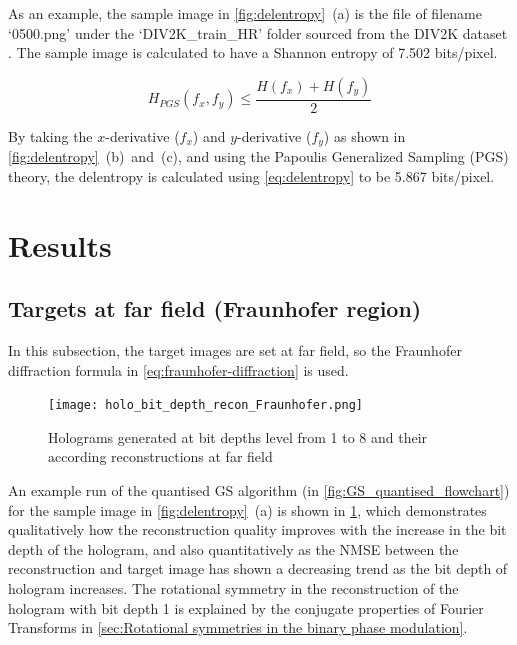 	As an example, the sample image in \cref{fig:delentropy}~(a) is the file of filename `0500.png' under the `DIV2K\_train\_HR' folder sourced from the DIV2K dataset \cite{Agustsson2017}. The sample image is calculated to have a Shannon entropy of 7.502 bits/pixel.

	\begin{equation}
		H_{PGS}(f_x, f_y) \leq \frac{H(f_x) + H(f_y)}{2}
		\label{eq:delentropy}
	\end{equation}

	By taking the $x$-derivative ($f_x$) and $y$-derivative ($f_y$) as shown in \cref{fig:delentropy}~(b)~and~(c), and using the Papoulis Generalized Sampling (PGS) \cite{Papoulis1977} theory, the delentropy is calculated using \cref{eq:delentropy}\cite{Larkin2016} to be 5.867 bits/pixel.




\section{Results}
\subsection{Targets at far field (Fraunhofer region)} \label{sec:Fraunhofer_results}
	In this subsection, the target images are set at far field, so the Fraunhofer diffraction formula in \cref{eq:fraunhofer-diffraction} is used.

	\begin{figure} [H]
	   \begin{center}
	   \texttt{[image: holo\_bit\_depth\_recon\_Fraunhofer.png]}
	   \end{center}
	   \caption{\label{fig:holo_bit_depth_recon_Fraunhofer} Holograms generated at bit depths level from 1 to 8 and their according reconstructions at far field}
	\end{figure}

	An example run of the quantised GS algorithm (in \cref{fig:GS_quantised_flowchart}) for the sample image in \cref{fig:delentropy}~(a) is shown in \cref{fig:holo_bit_depth_recon_Fraunhofer}, which demonstrates qualitatively how the reconstruction quality improves with the increase in the bit depth of the hologram, and also quantitatively as the NMSE between the reconstruction and target image has shown a decreasing trend as the bit depth of hologram increases. The rotational symmetry in the reconstruction of the hologram with bit depth 1 is explained by the conjugate properties of Fourier Transforms in \cref{sec:Rotational symmetries in the binary phase modulation}.

